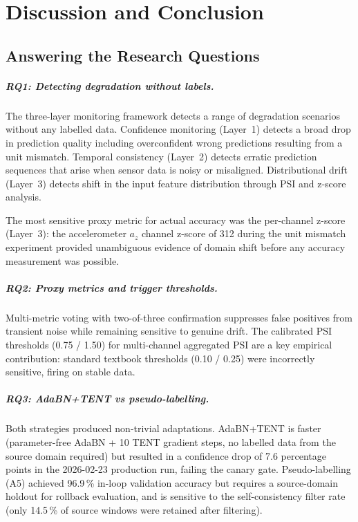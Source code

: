 \chapter{Discussion and Conclusion}
\label{ch:discussion}

\section{Answering the Research Questions}
\label{sec:rq_answers}

\paragraph{RQ1: Detecting degradation without labels.}
The three-layer monitoring framework detects a range of degradation scenarios
without any labelled data.
Confidence monitoring (Layer~1) detects a broad drop in prediction quality
including overconfident wrong predictions resulting from a unit mismatch.
Temporal consistency (Layer~2) detects erratic prediction sequences that arise
when sensor data is noisy or misaligned.
Distributional drift (Layer~3) detects shift in the input feature distribution
through PSI and z-score analysis.

The most sensitive proxy metric for actual accuracy was the per-channel
z-score (Layer~3): the accelerometer $a_z$ channel z-score of 312 during the
unit mismatch experiment provided unambiguous evidence of domain shift before
any accuracy measurement was possible.

\paragraph{RQ2: Proxy metrics and trigger thresholds.}
Multi-metric voting with two-of-three confirmation suppresses false positives
from transient noise while remaining sensitive to genuine drift.
The calibrated PSI thresholds (0.75 / 1.50) for multi-channel aggregated PSI
are a key empirical contribution: standard textbook thresholds (0.10 / 0.25)
were incorrectly sensitive, firing on stable data.

\paragraph{RQ3: AdaBN+TENT vs pseudo-labelling.}
Both strategies produced non-trivial adaptations.
AdaBN+TENT is faster (parameter-free AdaBN + 10 TENT gradient steps, no
labelled data from the source domain required) but resulted in a confidence
drop of 7.6 percentage points in the 2026-02-23 production run, failing the
canary gate.
Pseudo-labelling (A5) achieved 96.9\,\% in-loop validation accuracy but
requires a source-domain holdout for rollback evaluation, and is sensitive to
the self-consistency filter rate (only 14.5\,\% of source windows were
retained after filtering).

